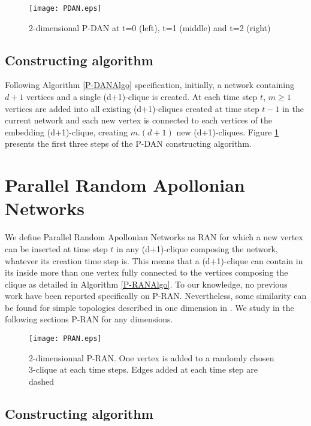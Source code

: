 \documentclass[11pt]{iopart}
\begin{document}
\begin{figure}[htbp]
\centering
\texttt{[image: PDAN.eps]}
\caption{2-dimensional P-DAN at t=0 (left), t=1 (middle) and t=2 (right)}
\label{PDANconstruct}
\end{figure}

\subsection{Constructing algorithm}


Following Algorithm \ref{P-DANAlgo} specification, initially, a network containing $d+1$ vertices and a single (d+1)-clique is created.
At each time step $t$, $m \ge 1$ vertices are added into all existing (d+1)-cliques created at time step $t-1$ in the current network and each new vertex is connected to each vertices of the embedding (d+1)-clique, creating $m.(d+1)$ new (d+1)-cliques. Figure \ref{PDANconstruct} presents the first three steps of the P-DAN constructing algorithm.

\section{Parallel Random Apollonian Networks}
We define Parallel Random Apollonian Networks as RAN for which a new vertex can be inserted at time step $t$ in any (d+1)-clique composing the network, whatever its creation time step is. This means that a (d+1)-clique can contain in its inside more than one vertex fully connected to the vertices composing the clique as detailed in Algorithm \ref{P-RANAlgo}.
To our knowledge, no previous work have been reported specifically on P-RAN.  Nevertheless, some similarity can be found for  simple topologies described in one dimension in \cite{Dorogovtsev:cond-mat0011115}. We study in the following sections P-RAN for any dimensions.

\begin{figure}[htbp]
\centering
\texttt{[image: PRAN.eps]}
\caption{2-dimensionnal P-RAN. One vertex is added to a randomly chosen 3-clique at each time steps. Edges added at each time step are dashed}
\label{PRANconstruct}
\end{figure}

\subsection{Constructing algorithm}
\end{document}
